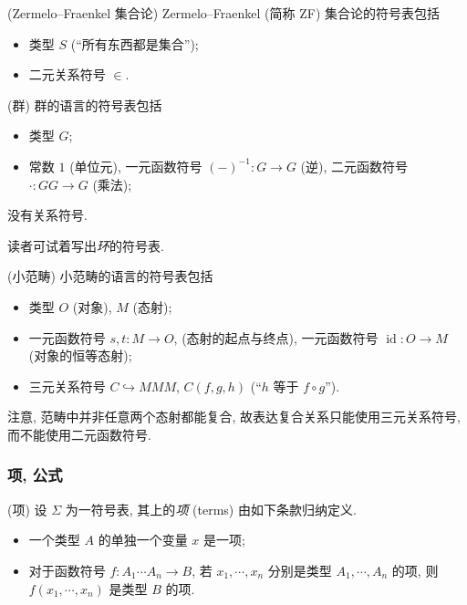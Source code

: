 \begin{example}
	[label={Zermelo--Fraenkel-language}]
	{(Zermelo--Fraenkel 集合论)}
	Zermelo--Fraenkel (简称 ZF) 集合论的符号表包括
	\begin{itemize}
		\item 类型 $S$ (``所有东西都是集合'');
		\item 二元关系符号 $\in$.
	\end{itemize}
\end{example}

\begin{example}
	[label={group-language}]
	{(群)}
	群的语言的符号表包括
	\begin{itemize}
		\item 类型 $G$;
		\item 常数 $1$ (单位元), 一元函数符号 $(-)^{-1}\colon G\to G$ (逆), 二元函数符号 $\cdot\colon GG \to G$ (乘法);
	\end{itemize}
	没有关系符号\footnotemark.
	
	读者可试着写出\emph{环}的符号表.
\end{example}


\begin{example}
	[label={small-category-language}]
	{(小范畴)}
	小范畴的语言的符号表包括
	\begin{itemize}
		\item 类型 $O$ (对象), $M$ (态射);
		\item 一元函数符号 $s,t\colon M\to O$,
		(态射的起点与终点), 一元函数符号 $\operatorname{id}\colon O\to M$
		(对象的恒等态射);
		\item 三元关系符号 $C\hookrightarrow MMM$,
		$C(f,g,h)$ (``$h$ 等于 $f\circ g$'').
	\end{itemize}
	注意, 范畴中并非任意两个态射都能复合, 故表达复合关系只能使用三元关系符号, 而不能使用二元函数符号.
\end{example}

\subsubsection{项, 公式}

\begin{definition}
	{(项)}
	设 $\Sigma$ 为一符号表, 其上的\emph{项} (terms) 由如下条款归纳定义.
	\begin{itemize}
		\item 一个类型 $A$ 的单独一个变量 $x$ 是一项;
		\item 对于函数符号 $f \colon A_1\cdots A_n \to B$, 若 $x_1,\cdots,x_n$ 分别是类型 $A_1,\cdots,A_n$ 的项, 则 $f(x_1,\cdots,x_n)$ 是类型 $B$ 的项.
	\end{itemize}
\end{definition}

